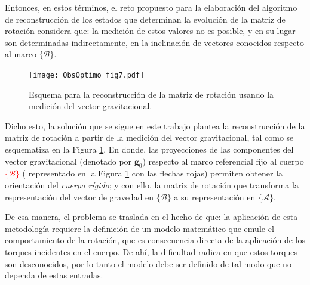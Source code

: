 \documentclass[10pt]{report}
\numberwithin{equation}{chapter}
\numberwithin{algorithm}{chapter}
\newcommand{\vect}[1]{\boldsymbol{#1}}
\newcommand{\marco}[1]{\{\mathcal{#1}\}}
\begin{document}
\par
Entonces, en estos términos, el reto propuesto para la elaboración del algoritmo de reconstrucción de los estados que determinan la evolución de la matriz de rotación considera que: la medición de estos valores no es posible, y en su lugar son determinadas indirectamente, en la inclinación de vectores conocidos respecto al marco $\marco{B}$.\par
\begin{figure}[t]
\begin{center}
\texttt{[image: ObsOptimo\_fig7.pdf]}
\caption{Esquema para la reconstrucción de la matriz de rotación usando la medición del vector gravitacional.}
\label{ObsOptimo_fig1}
\end{center}
\end{figure}
Dicho esto, la solución que se sigue en este trabajo plantea la reconstrucción de la matriz de rotación a partir de la medición del vector gravitacional, tal como se esquematiza en la Figura \ref{ObsOptimo_fig1}. En donde, las proyecciones de las componentes del vector gravitacional (denotado por $\vect{g}_0$) respecto al marco referencial fijo al cuerpo \textcolor{red}{$\marco{B}$} ( representado en la Figura \ref{ObsOptimo_fig1} con las flechas rojas) permiten obtener la orientación del \textsl{cuerpo rígido}; y con ello, la matriz de rotación que transforma la representación del vector de gravedad en $\marco{B}$ a su representación en $\marco{A}$.\par
De esa manera, el problema se traslada en el hecho de que: la aplicación de esta metodología requiere la definición de un modelo matemático que emule el comportamiento de la rotación, que es consecuencia directa de la aplicación de los torques incidentes en el cuerpo. De ahí, la dificultad radica en que estos torques son desconocidos, por lo tanto el modelo debe ser definido de tal modo que no dependa de estas entradas.\par
\end{document}
